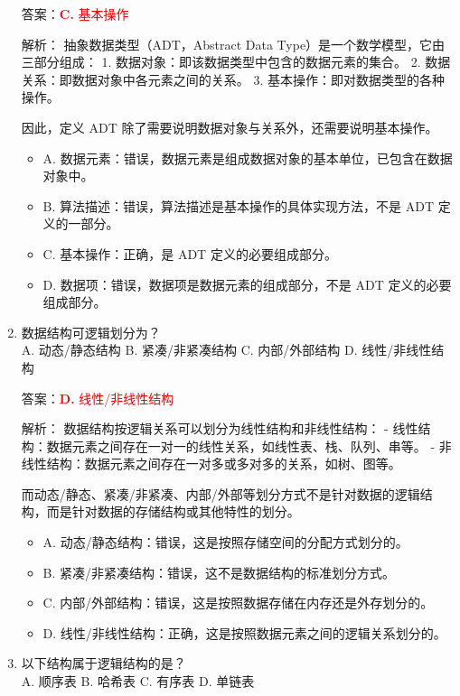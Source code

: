 \documentclass[lang=cn,newtx,10pt,scheme=chinese]{../../../elegantbook}
\begin{document}
\begin{enumerate}
    答案：\textcolor{red}{\textbf{C.} 基本操作}

    解析：
    抽象数据类型（ADT，Abstract Data Type）是一个数学模型，它由三部分组成：
    1. 数据对象：即该数据类型中包含的数据元素的集合。
    2. 数据关系：即数据对象中各元素之间的关系。
    3. 基本操作：即对数据类型的各种操作。
    
    因此，定义 ADT 除了需要说明数据对象与关系外，还需要说明基本操作。

    \begin{itemize}
        \item A. 数据元素：错误，数据元素是组成数据对象的基本单位，已包含在数据对象中。
        \item B. 算法描述：错误，算法描述是基本操作的具体实现方法，不是 ADT 定义的一部分。
        \item C. 基本操作：正确，是 ADT 定义的必要组成部分。
        \item D. 数据项：错误，数据项是数据元素的组成部分，不是 ADT 定义的必要组成部分。
    \end{itemize}

    \item 数据结构可逻辑划分为？\\
    A. 动态/静态结构 \quad B. 紧凑/非紧凑结构
    \quad C. 内部/外部结构 \quad D. 线性/非线性结构

    答案：\textcolor{red}{\textbf{D.} 线性/非线性结构}

    解析：
    数据结构按逻辑关系可以划分为线性结构和非线性结构：
    - 线性结构：数据元素之间存在一对一的线性关系，如线性表、栈、队列、串等。
    - 非线性结构：数据元素之间存在一对多或多对多的关系，如树、图等。
    
    而动态/静态、紧凑/非紧凑、内部/外部等划分方式不是针对数据的逻辑结构，而是针对数据的存储结构或其他特性的划分。

    \begin{itemize}
        \item A. 动态/静态结构：错误，这是按照存储空间的分配方式划分的。
        \item B. 紧凑/非紧凑结构：错误，这不是数据结构的标准划分方式。
        \item C. 内部/外部结构：错误，这是按照数据存储在内存还是外存划分的。
        \item D. 线性/非线性结构：正确，这是按照数据元素之间的逻辑关系划分的。
    \end{itemize}

    \item 以下结构属于逻辑结构的是？\\
    A. 顺序表 \quad B. 哈希表 \quad C. 有序表 \quad D. 单链表


\end{enumerate}
\end{document}
